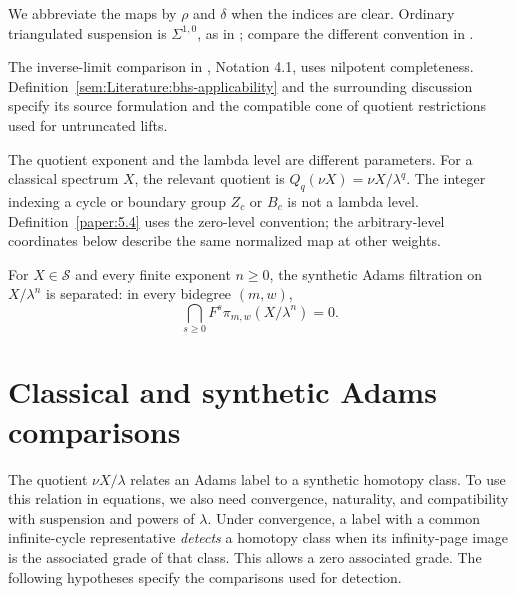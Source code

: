 We abbreviate the maps by $\rho$ and $\delta$ when the indices are clear.
Ordinary triangulated suspension is $\Sigma^{1,0}$, as in
\cite[Appendix A]{BHS}; compare the different convention in
\cite[Section 7]{BurklundXu}.

The inverse-limit comparison in \cite{LWX126}, Notation 4.1, uses
nilpotent completeness. Definition~\ref{sem:Literature:bhs-applicability}
and the surrounding discussion specify its source formulation and the
compatible cone of quotient restrictions used for untruncated lifts.

The quotient exponent and the lambda level are different parameters.
For a classical spectrum $X$, the relevant quotient is
$Q_q(\nu X)=\nu X/\lambda^q$. The integer indexing a cycle or boundary group
$Z_c$ or $B_c$ is not a lambda level. Definition~\ref{paper:5.4} uses
the zero-level convention; the arbitrary-level coordinates below describe
the same normalized map at other weights.



\begin{theorem}
\label{sem:AdamsSynthetic:finite-quotient-separation}
For $X\in\mathcal S$ and every finite exponent $n\geq0$, the
synthetic Adams filtration on $X/\lambda^n$ is separated: in every
bidegree $(m,w)$,
\[
 \bigcap_{s\geq0}F^s\pi_{m,w}(X/\lambda^n)=0.
\]
\end{theorem}

\section{Classical and synthetic Adams comparisons}

The quotient $\nu X/\lambda$ relates an Adams label to a synthetic
homotopy class. To use this relation in equations, we also need
convergence, naturality, and compatibility with suspension and powers of
$\lambda$. Under convergence, a label with a common infinite-cycle
representative \emph{detects} a homotopy class when its infinity-page
image is the associated grade of that class. This allows a zero
associated grade. The following hypotheses
specify the comparisons used for detection.



